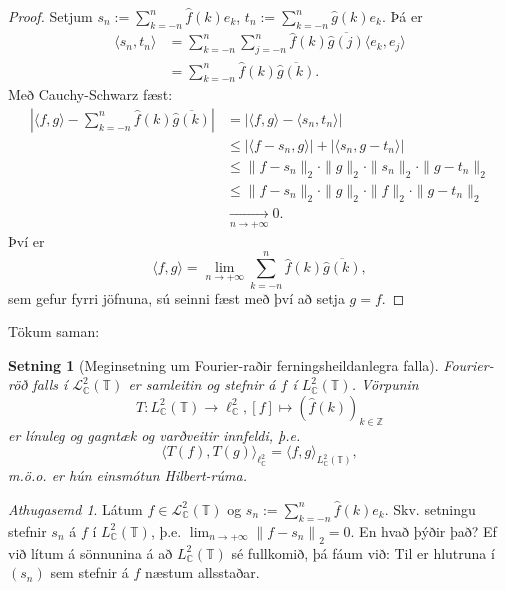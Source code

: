 \documentclass[a4paper,icelandic,11pt]{book}
\theoremstyle{plain}      \newtheorem{setn}{Setning}[chapter]
\theoremstyle{definition} \newtheorem{skilgr}[setn]{Skilgreining}
\theoremstyle{remark}     \newtheorem*{ath}{Athugasemd}
\newcommand{\C}{\mathbb C}
\newcommand{\Z}{\mathbb Z}
\begin{document}
\begin{proof}
  Setjum $s_{n} := \sum_{k=-n}^{n}\hat f(k)e_k$,
  $t_n:=\sum_{k=-n}^{n}\hat g(k)e_{k}$. Þá er
  \begin{align*}
    \langle s_{n},t_{n}\rangle
    &= \sum_{k=-n}^{n}\sum_{j=-n}^{n}
    \hat f(k)\overline{\hat g(j)}\langle e_{k},e_{j}\rangle
    \\
    &= \sum_{k=-n}^{n}\hat f(k)\overline{\hat g(k)}.
  \end{align*}
  Með Cauchy-Schwarz fæst:
  \begin{align*}
    \left|
      \langle f,g\rangle
      - \sum_{k=-n}^{n} \hat f(k) \overline{\hat g(k)}
    \right|
    &= \left|
      \langle f,g\rangle
      - \langle s_{n}, t_{n}\rangle
    \right|
    \\
    &\le | \langle f - s_{n},g \rangle |
    + | \langle s_{n},g - t_{n}\rangle |
    \\
    &\le \| f - s_{n}\|_{2}
    \cdot \| g\|_{2} \cdot \| s_{n} \|_{2}
    \cdot \| g - t_{n}\|_{2}
    \\
    &\le \| f - s_{n}\|_{2}
    \cdot \| g\|_{2} \cdot \| f \|_{2}
    \cdot \| g - t_{n}\|_{2}
    \\
    &\xrightarrow[n\to+\infty]{}0.
  \end{align*}
  Því er 
  \[
  \langle f,g\rangle
  = \lim_{n\to +\infty}\sum_{k=-n}^{n}\hat f(k)\overline{\hat g(k)},
  \]
  sem gefur fyrri jöfnuna, sú seinni fæst með því að setja $g = f$.
\end{proof}
Tökum saman:
\begin{setn}
  [Meginsetning um Fourier-raðir ferningsheildanlegra falla]
  Fourier-röð falls í $\mathcal L_{\C}^{2}(\mathbb T)$ er samleitin og
  stefnir á $f$ í $L_{\C}^{2}(\mathbb T)$. Vörpunin 
  \[
  T : L_{\C}^{2}(\mathbb T) \to\ell_{\C}^{2},
  [f]\mapsto (\hat f(k))_{k\in\Z}
  \]
  er línuleg og \emph{gagntæk} og varðveitir innfeldi, þ.e. 
  \[
  \langle T(f),T(g)\rangle_{\ell^{2}_{\C}}
  = \langle f,g\rangle_{L^{2}_{\C}(\mathbb T)},
  \]
  m.ö.o. er hún \emph{einsmótun Hilbert-rúma}.
\end{setn}
\begin{ath}
  Látum $f\in\mathcal L_{\C}^{2}(\mathbb T)$ og
  $s_{n}:=\sum_{k=-n}^{n}\hat f(k)e_{k}$. Skv. setningu stefnir
  $s_{n}$ á $f$ í $L_{\C}^{2}(\mathbb T)$,
  þ.e. $\lim_{n\to+\infty}\left\| f - s_{n} \right\|_{2} = 0$. En hvað
  þýðir það? Ef við lítum á sönnunina á að $L_{\C}^{2}(\mathbb T)$ sé
  fullkomið, þá fáum við: Til er hlutruna í $(s_{n})$ sem stefnir á
  $f$ næstum allsstaðar. 
\end{ath}
\end{document}
